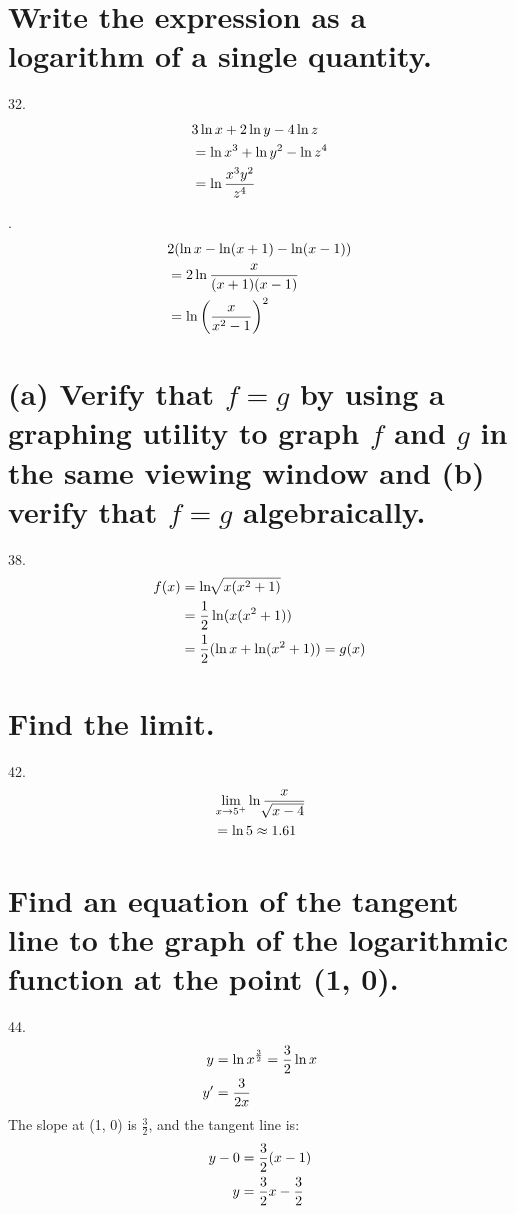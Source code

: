 \documentclass[11pt]{article}
\newcommand*{\vs}{\vspace{1cm}}
\newcommand*{\next}{\noindent}
\newcommand*{\set}{\setcounter{equation}{0}}
\newcommand*{\lt}{\left}
\newcommand*{\rt}{\right}
\begin{document}
\section{Write the expression as a logarithm of a
single quantity.}
32.\begin{align}
    \set
    &3\ln x+2\ln y-4\ln z\\
    &=\ln x^3+\ln y^2-\ln z^4\\
    &=\ln\frac{x^3y^2}{z^4}
\end{align}

\vs\next
34.\begin{align}
    \set
    &2(\ln x-\ln(x+1)-\ln(x-1))\\
    &=2\ln\frac{x}{(x+1)(x-1)}\\
    &=\ln\lt(\frac{x}{x^2-1}\rt)^2
\end{align}

\section{(a) Verify that $f=g$ by using a graphing utility to graph $f$ and $g$ in the same viewing window and (b) verify that $f=g$ algebraically.}
38.\begin{align}
    \set
    f(x)&=\ln\sqrt[]{x(x^2+1)}\\
    &=\frac{1}{2}\ln(x(x^2+1))\\
    &=\frac{1}{2}(\ln x+\ln(x^2+1))=g(x)
\end{align}

\section{Find the limit.}
42.\begin{align}
    \set
    &\lim_{x\to 5^+}\ln\frac{x}{\sqrt[]{x-4}}\\
    &=\ln 5\approx 1.61
\end{align}

\section{Find an equation of the tangent line to the
graph of the logarithmic function at the point (1, 0).}
44.\begin{align}
    \set
    y&=\ln x^{\frac{3}{2}}=\frac{3}{2}\ln x\\
    y'&=\frac{3}{2x}
\end{align}
The slope at (1, 0) is $\frac{3}{2}$, and the tangent line is:
\begin{align}
    \set
    y-0&=\frac{3}{2}(x-1)\\
    y&=\frac{3}{2}x-\frac{3}{2}
\end{align}
\end{document}
